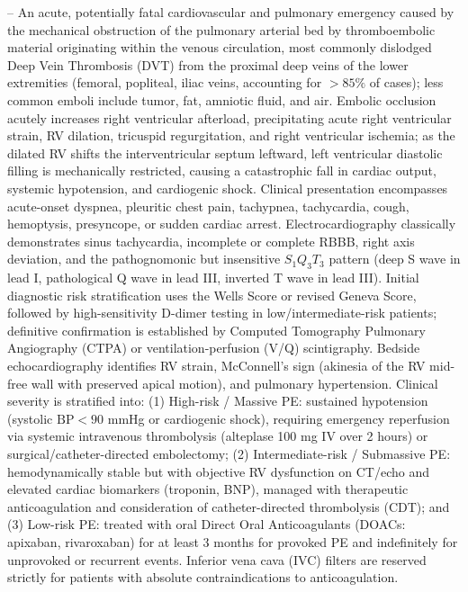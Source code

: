 -- An acute, potentially fatal cardiovascular and pulmonary emergency caused by the mechanical obstruction of the pulmonary arterial bed by thromboembolic material originating within the venous circulation, most commonly dislodged Deep Vein Thrombosis (DVT) from the proximal deep veins of the lower extremities (femoral, popliteal, iliac veins, accounting for $>85\%$ of cases); less common emboli include tumor, fat, amniotic fluid, and air. Embolic occlusion acutely increases right ventricular afterload, precipitating acute right ventricular strain, RV dilation, tricuspid regurgitation, and right ventricular ischemia; as the dilated RV shifts the interventricular septum leftward, left ventricular diastolic filling is mechanically restricted, causing a catastrophic fall in cardiac output, systemic hypotension, and cardiogenic shock. Clinical presentation encompasses acute-onset dyspnea, pleuritic chest pain, tachypnea, tachycardia, cough, hemoptysis, presyncope, or sudden cardiac arrest. Electrocardiography classically demonstrates sinus tachycardia, incomplete or complete RBBB, right axis deviation, and the pathognomonic but insensitive $S_1Q_3T_3$ pattern (deep S wave in lead I, pathological Q wave in lead III, inverted T wave in lead III). Initial diagnostic risk stratification uses the Wells Score or revised Geneva Score, followed by high-sensitivity D-dimer testing in low/intermediate-risk patients; definitive confirmation is established by Computed Tomography Pulmonary Angiography (CTPA) or ventilation-perfusion (V/Q) scintigraphy. Bedside echocardiography identifies RV strain, McConnell's sign (akinesia of the RV mid-free wall with preserved apical motion), and pulmonary hypertension. Clinical severity is stratified into: (1) High-risk / Massive PE: sustained hypotension (systolic $\text{BP} < 90$ mmHg or cardiogenic shock), requiring emergency reperfusion via systemic intravenous thrombolysis (alteplase 100 mg IV over 2 hours) or surgical/catheter-directed embolectomy; (2) Intermediate-risk / Submassive PE: hemodynamically stable but with objective RV dysfunction on CT/echo and elevated cardiac biomarkers (troponin, BNP), managed with therapeutic anticoagulation and consideration of catheter-directed thrombolysis (CDT); and (3) Low-risk PE: treated with oral Direct Oral Anticoagulants (DOACs: apixaban, rivaroxaban) for at least 3 months for provoked PE and indefinitely for unprovoked or recurrent events. Inferior vena cava (IVC) filters are reserved strictly for patients with absolute contraindications to anticoagulation.

